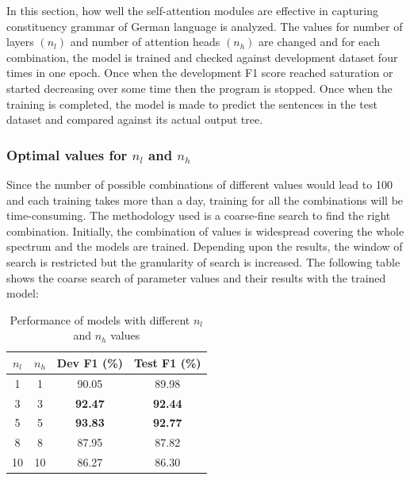 \documentclass[a4paper, 11pt]{article}
\begin{document}
In this section, how well the self-attention modules are effective in capturing constituency grammar of German language is analyzed. The values for number of layers $(n_l)$ and number of attention heads $(n_h)$ are changed and for each combination, the model is trained and checked against development dataset four times in one epoch. Once when the development F1 score reached saturation or started decreasing over some time then the program is stopped. Once when the training is completed, the model is made to predict the sentences in the test dataset and compared against its actual output tree. 

\subsubsection{Optimal values for $n_l$ and $n_h$}

Since the number of possible combinations of different values would lead to 100 and each training takes more than a day, training for all the combinations will be time-consuming. The methodology used is a coarse-fine search to find the right combination. Initially, the combination of values is widespread covering the whole spectrum and the models are trained. Depending upon the results, the window of search is restricted but the granularity of search is increased. The following table shows the coarse search of parameter values and their results with the trained model:

\begin{table}[h!]
  \begin{center}
    \label{tab:coarse_search_for_layers_heads}
    \def\arraystretch{1.5}%
    \begin{tabular}{c|c|c|c}
      \textbf{$n_l$} & \textbf{$n_h$} & Dev F1 (\%) & Test F1 (\%) \\
      \hline
      1 & 1 & 90.05 & 89.98\\
      3 & 3 & \textbf{92.47} & \textbf{92.44}\\
      5 & 5 & \textbf{93.83} & \textbf{92.77}\\
      8 & 8 & 87.95 & 87.82\\
      10 & 10 & 86.27 & 86.30\\
    \end{tabular}
    \caption{Performance of models with different $n_l$ and $n_h$ values}
  \end{center}
\end{table}
\end{document}
